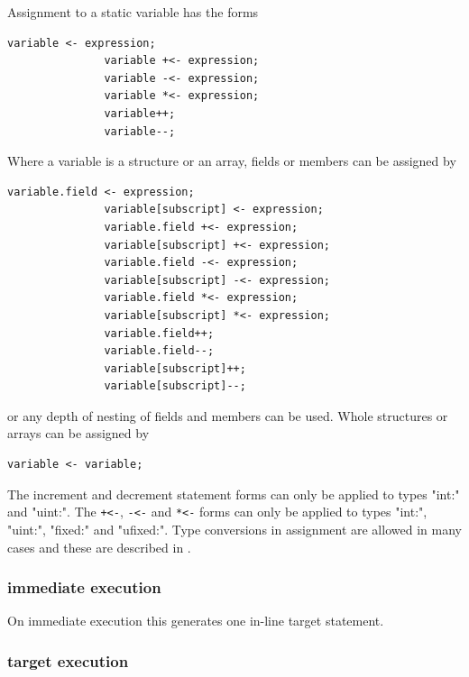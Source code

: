         Assignment to a static variable has the forms
        \begin{lstlisting}[gobble=8, language=threepl]
               variable <- expression;
               variable +<- expression;
               variable -<- expression;
               variable *<- expression;
               variable++;
               variable--;
        \end{lstlisting}
        Where a variable is a structure or an array, fields or members can be
        assigned by
        \begin{lstlisting}[gobble=8, language=threepl]
               variable.field <- expression;
               variable[subscript] <- expression;
               variable.field +<- expression;
               variable[subscript] +<- expression;
               variable.field -<- expression;
               variable[subscript] -<- expression;
               variable.field *<- expression;
               variable[subscript] *<- expression;
               variable.field++;
               variable.field--;
               variable[subscript]++;
               variable[subscript]--;
        \end{lstlisting}
        or any depth of nesting of fields and members can be used. Whole
        structures or arrays can be assigned by
        \begin{lstlisting}[gobble=8, language=threepl]
               variable <- variable;
        \end{lstlisting}
        
        The increment and decrement statement forms can only be applied to types
        "int:" and "uint:". The \verb'+<-', \verb'-<-' and \verb'*<-' forms can
        only be applied to types "int:", "uint:", "fixed:" and "ufixed:". Type
        conversions in assignment are allowed in many cases and these are
        described in .
        

        \subsubsection{immediate execution}
        
            On immediate execution this generates one in-line target statement.
        
        \subsubsection{target execution}        

